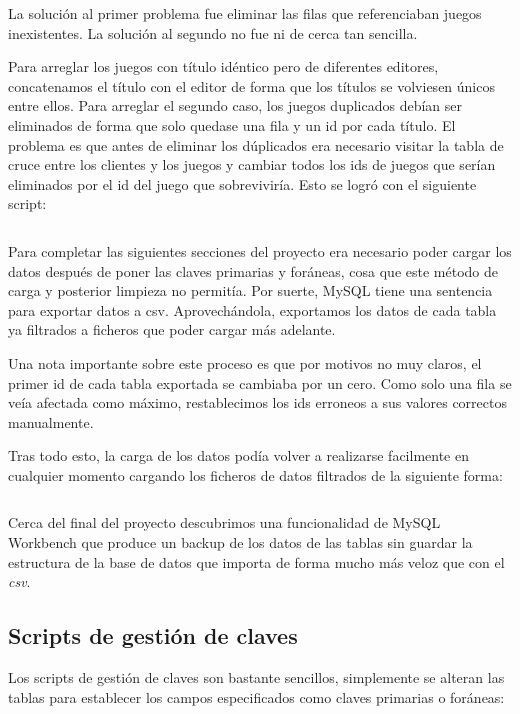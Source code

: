 \documentclass[a4paper, 11pt, oneside]{article} %
\newcommand{\scriptdir}{../scripts/} %
\begin{document}
La solución al primer problema fue eliminar las filas que referenciaban juegos inexistentes. La solución al segundo no fue ni de cerca tan sencilla.

Para arreglar los juegos con título idéntico pero de diferentes editores, concatenamos el título con el editor de forma que los títulos se volviesen únicos entre ellos. Para arreglar el segundo caso, los juegos duplicados debían ser eliminados de forma que solo quedase una fila y un id por cada título. El problema es que antes de eliminar los dúplicados era necesario visitar la tabla de cruce entre los clientes y los juegos y cambiar todos los ids de juegos que serían eliminados por el id del juego que sobreviviría. Esto se logró con el siguiente script:

\inputminted{mysql}{\scriptdir limpieza_datos.sql}

Para completar las siguientes secciones del proyecto era necesario poder cargar los datos después de poner las claves primarias y foráneas, cosa que este método de carga y posterior limpieza no permitía. Por suerte, MySQL tiene una sentencia para exportar datos a csv. Aprovechándola, exportamos los datos de cada tabla ya filtrados a ficheros que poder cargar más adelante.

Una nota importante sobre este proceso es que por motivos no muy claros, el primer id de cada tabla exportada se cambiaba por un cero. Como solo una fila se veía afectada como máximo, restablecimos los ids erroneos a sus valores correctos manualmente.

Tras todo esto, la carga de los datos podía volver a realizarse facilmente en cualquier momento cargando los ficheros de datos filtrados de la siguiente forma:

\inputminted{mysql}{\scriptdir load_curated_data.sql}

Cerca del final del proyecto descubrimos una funcionalidad de MySQL Workbench que produce un backup de los datos de las tablas sin guardar la estructura de la base de datos que importa de forma mucho más veloz que con el \emph{csv}.

\subsection{Scripts de gestión de claves}

Los scripts de gestión de claves son bastante sencillos, simplemente se alteran las tablas para establecer los campos especificados como claves primarias o foráneas:
\end{document}
